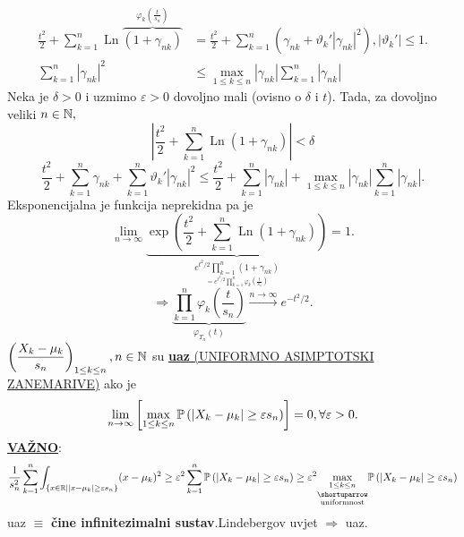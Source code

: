 \documentclass{article}
\newcommand{\Ln}{\operatorname{Ln}}
\begin{document}
\[\begin{aligned}\frac{t^2}2+\sum_{k=1}^n\Ln \overbrace{\left(1+\gamma_{nk}\right)}^{\varphi_k\left(\frac{t}{s_n}\right)}&=\frac{t^2}2+\sum_{k=1}^n\left(\gamma_{nk}+\vartheta_k'|\gamma_{nk}|^2\right),|\vartheta_k'|\le 1.\\\sum_{k=1}^n|\gamma_{nk}|^2&\le\max_{1\le k\le n}|\gamma_{nk}|\sum_{k=1}^n|\gamma_{nk}|\end{aligned}\]
Neka je \(\delta>0\) i uzmimo \(\varepsilon>0\) dovoljno mali (ovisno o \(\delta\) i \(t\)). Tada, za dovoljno veliki \(n\in\Bbb N,\) \[\left|\frac{t^2}2+\sum_{k=1}^n\Ln (1+\gamma_{nk})\right|<\delta\]
\[\frac{t^2}2+\sum_{k=1}^n\gamma_{nk}+\sum_{k=1}^n\vartheta_k'|\gamma_{nk}|^2\le\frac{t^2}2+\sum_{k=1}^n|\gamma_{nk}|+\max_{1\le k\le n}|\gamma_{nk}|\sum_{k=1}^n|\gamma_{nk}|.\]
Eksponencijalna je funkcija neprekidna pa je \[\lim_{n\to\infty}\underbrace{\exp\left(\frac{t^2}2+\sum_{k=1}^n\Ln (1+\gamma_{nk})\right)}_{\displaystyle\underset{\displaystyle =e^{t^2/2}\prod_{k=1}^n\varphi_k\left(\frac{t}{s_n}\right)}{e^{t^2/2}\prod_{k=1}^n(1+\gamma_{nk})}}=1.\] \[\Rightarrow\underbrace{\prod_{k=1}^n\varphi_k\left(\frac{t}{s_n}\right)}_{\varphi_{T_n}(t)}\overset{n\to\infty}{\longrightarrow}e^{-t^2/2}.\]\newpage 
\(\left(\dfrac{X_k-\mu_k}{s_n}\right)_{1\le k\le n},n\in\Bbb N\) su \underline{\textbf{uaz} (UNIFORMNO ASIMPTOTSKI ZANEMARIVE)} ako je \[\lim_{n\to\infty}\left[\max_{1\le k\le n}\Bbb P\left(|X_k-\mu_k|\ge\varepsilon s_n\right)\right]=0,\forall\varepsilon>0.\] 
\underline{\textbf{VAŽNO}}:
\[\frac1{s_n^2}\sum_{k=1}^n\int_{\left\{x\in\Bbb R\mid |x-\mu_k|\ge\varepsilon s_n\right\}}(x-\mu_k)^2\ge\varepsilon^2\sum_{k=1}^n\Bbb P\left(|X_k-\mu_k|\ge\varepsilon s_n\right)\ge\varepsilon^2\underset{\substack{\shortuparrow\\\text{uniformnost}}}{\max_{1\le k\le n}}\Bbb P\left(|X_k-\mu_k|\ge\varepsilon s_n\right)\]
uaz \(\equiv\) \textbf{čine infinitezimalni sustav}.\newline Lindebergov uvjet \(\Rightarrow\) uaz.
\newpage
\end{document}
